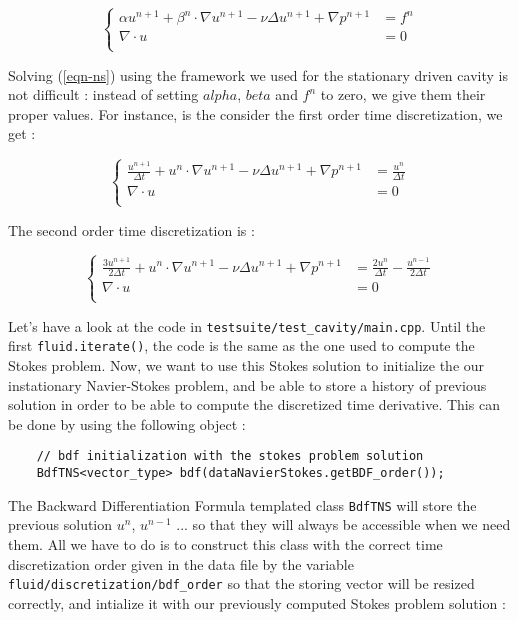 \begin{equation*} \label{eqn-ns}
\left\{
\begin{array}{rl}
\displaystyle \alpha u^{n+1} + \beta^n \cdot \nabla u^{n+1} - \nu \Delta u^{n+1}+
\nabla p^{n+1} & = f^n  \\
\displaystyle \nabla \cdot u & = 0  \\
\end{array}
\right.
\end{equation*}

Solving (\ref{eqn-ns}) using the framework we used for the stationary driven cavity is not difficult :
instead of setting $alpha$, $beta$ and $f^n$ to zero, we give them their proper values. For instance,
is the consider the first order time discretization, we get :

\begin{equation*} \label{eqn-nso1}
\left\{
\begin{array}{rl}
\displaystyle \frac {u^{n+1}}{\Delta t} + u^n \cdot \nabla u^{n+1} - \nu \Delta u^{n+1}+
\nabla p^{n+1} & = \displaystyle \frac{u^n}{\Delta t}  \\
\displaystyle \nabla \cdot u & = 0  \\
\end{array}
\right.
\end{equation*}

The second order time discretization is :

\begin{equation*} \label{eqn-nso2}
\left\{
\begin{array}{rl}
\displaystyle \frac {3u^{n+1}}{2\Delta t} + u^n \cdot \nabla u^{n+1} - \nu \Delta u^{n+1}+
\nabla p^{n+1} & = \displaystyle \frac{2u^n}{\Delta t} - \frac{u^{n-1}}{2\Delta t}  \\
\displaystyle \nabla \cdot u & = 0  \\
\end{array}
\right.
\end{equation*}

Let's have a look at the code in \verb!testsuite/test_cavity/main.cpp!.
Until the first \verb!fluid.iterate()!, the code is the same as the one used to compute the Stokes problem.
Now, we want to use this Stokes solution to initialize the our instationary Navier-Stokes problem, and be able
to store a history of previous solution in order to be able to compute the discretized time derivative.
This can be done by using the following object :
\begin{verbatim}
    // bdf initialization with the stokes problem solution
    BdfTNS<vector_type> bdf(dataNavierStokes.getBDF_order());
\end{verbatim}
The Backward Differentiation Formula templated class \verb!BdfTNS!  will store the previous solution $u^n$, $u^{n-1}$ ... so that
they will always be accessible when we need them. All we have to do is to construct this class
with the correct time discretization order given in the data file by the variable \verb!fluid/discretization/bdf_order!
so that the storing vector will be resized correctly, and intialize it with our previously computed Stokes problem solution :

